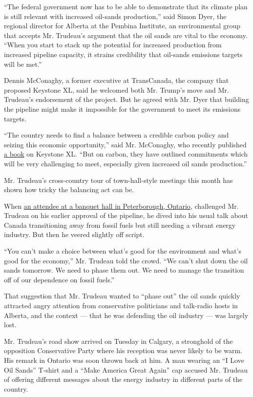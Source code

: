 ``The federal government now has to be able to demonstrate that its
climate plan is still relevant with increased oil-sands production,''
said Simon Dyer, the regional director for Alberta at the Pembina
Institute, an environmental group that accepts Mr. Trudeau's argument
that the oil sands are vital to the economy. ``When you start to stack
up the potential for increased production from increased pipeline
capacity, it strains credibility that oil-sands emissions targets will
be met.''

Dennis McConaghy, a former executive at TransCanada, the company that
proposed Keystone XL, said he welcomed both Mr. Trump's move and Mr.
Trudeau's endorsement of the project. But he agreed with Mr. Dyer that
building the pipeline might make it impossible for the government to
meet its emissions targets.

``The country needs to find a balance between a credible carbon policy
and seizing this economic opportunity,'' said Mr. McConaghy, who
recently published \href{https://www.dundurn.com/books/Dysfunction}{a
book} on Keystone XL. ``But on carbon, they have outlined commitments
which will be very challenging to meet, especially given increased oil
sands production.''

Mr. Trudeau's cross-country tour of town-hall-style meetings this month
has shown how tricky the balancing act can be.

When
\href{https://www.nytimes.com/2017/01/18/world/canada/justin-trudeau-canada-town-hall-tour.html}{an
attendee at a banquet hall in Peterborough, Ontario}, challenged Mr.
Trudeau on his earlier approval of the pipeline, he dived into his usual
talk about Canada transitioning away from fossil fuels but still needing
a vibrant energy industry. But then he veered slightly off script.

``You can't make a choice between what's good for the environment and
what's good for the economy,'' Mr. Trudeau told the crowd. ``We can't
shut down the oil sands tomorrow. We need to phase them out. We need to
manage the transition off of our dependence on fossil fuels.''

That suggestion that Mr. Trudeau wanted to ``phase out'' the oil sands
quickly attracted angry attention from conservative politicians and
talk-radio hosts in Alberta, and the context --- that he was defending
the oil industry --- was largely lost.

Mr. Trudeau's road show arrived on Tuesday in Calgary, a stronghold of
the opposition Conservative Party where his reception was never likely
to be warm. His remark in Ontario was soon thrown back at him. A man
wearing an ``I Love Oil Sands'' T-shirt and a ``Make America Great
Again'' cap accused Mr. Trudeau of offering different messages about the
energy industry in different parts of the country.

